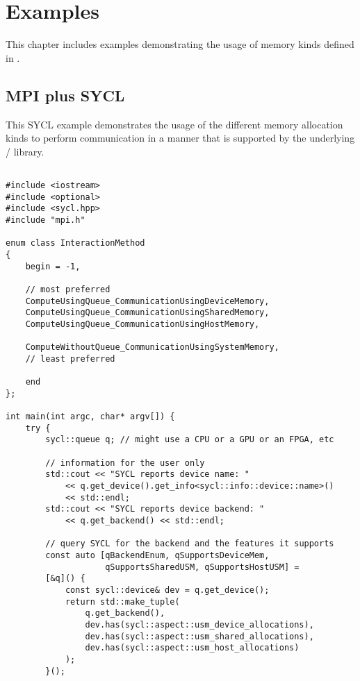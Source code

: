 \chapter{Examples}
\label{chap:examples}

This chapter includes examples demonstrating the usage of
memory kinds defined in .

\section{MPI plus SYCL}

\begin{example}
\label{example:alloc-kind-spm-sycl}
This SYCL example demonstrates the usage of the different
memory allocation kinds to perform communication in a manner
that is supported by the underlying \mpi/ library.
\begin{lstlisting}[language={[MPI]C++}]

#include <iostream>
#include <optional>
#include <sycl.hpp>
#include "mpi.h"

enum class InteractionMethod
{
    begin = -1,

    // most preferred
    ComputeUsingQueue_CommunicationUsingDeviceMemory,
    ComputeUsingQueue_CommunicationUsingSharedMemory,
    ComputeUsingQueue_CommunicationUsingHostMemory,

    ComputeWithoutQueue_CommunicationUsingSystemMemory,
    // least preferred

    end
};

int main(int argc, char* argv[]) {
    try {
        sycl::queue q; // might use a CPU or a GPU or an FPGA, etc

        // information for the user only
        std::cout << "SYCL reports device name: "
            << q.get_device().get_info<sycl::info::device::name>()
            << std::endl;
        std::cout << "SYCL reports device backend: "
            << q.get_backend() << std::endl;

        // query SYCL for the backend and the features it supports
        const auto [qBackendEnum, qSupportsDeviceMem,
                    qSupportsSharedUSM, qSupportsHostUSM] =
        [&q]() {
            const sycl::device& dev = q.get_device();
            return std::make_tuple(
                q.get_backend(),
                dev.has(sycl::aspect::usm_device_allocations),
                dev.has(sycl::aspect::usm_shared_allocations),
                dev.has(sycl::aspect::usm_host_allocations)
            );
        }();


\end{lstlisting}
\end{example}
